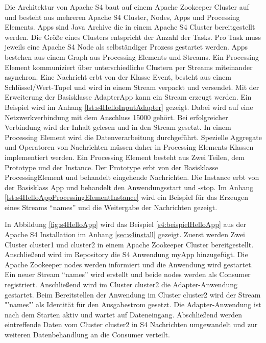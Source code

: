 Die Architektur von Apache S4 baut auf einem Apache Zookeeper Cluster auf und besteht aus mehreren Apache S4 Cluster, Nodes, Apps und Processing Elements. Apps sind Java Archive die in einem Apache S4 Cluster bereitgestellt werden. Die Größe eines Clusters entspricht der Anzahl der Tasks. Pro Task muss jeweils eine Apache S4 Node als selbständiger Prozess gestartet werden. Apps bestehen aus einem Graph aus Processing Elements und Streams. Ein Processing Element kommuniziert über unterschiedliche Clustern per Streams miteinander asynchron. Eine Nachricht erbt von der Klasse Event, besteht aus einem Schlüssel/Wert-Tupel und wird in einem Stream verpackt und versendet. Mit der Erweiterung der Basisklasse AdapterApp kann ein Stream erzeugt werden. Ein Beispiel wird im Anhang \ref{lst:s4HelloInputAdapter} gezeigt. Dabei wird auf eine Netzwerkverbindung mit dem Anschluss 15000 gehört. Bei erfolgreicher Verbindung wird der Inhalt gelesen und in den Stream gesetzt. In einem Processing Element wird die Datenverarbeitung durchgeführt. Spezielle Aggregate und Operatoren von Nachrichten müssen daher in Processing Elements-Klassen implementiert werden. Ein Processing Element besteht aus Zwei Teilen, dem Prototype und der Instance. Der Prototype erbt von der Basisklasse ProcessingElement und behandelt eingehende Nachrichten. Die Instance erbt von der Basisklass App und behandelt den Anwendungsstart und -stop. Im Anhang \ref{lst:s4HelloAppProcessingElementInstance} wird ein Beispiel für das Erzeugen eines Streams "`names"' und die Weitergabe der Nachrichten gezeigt. 

In Abbildung \ref{fig:s4HelloApp} wird das Beispiel \ref{s4:beispielHelloApp} aus der Apache S4 Installation im Anhang \ref{sec:s4install} gezeigt. Zuerst werden Zwei Cluster cluster1 und cluster2 in einem Apache Zookeeper Cluster bereitgestellt. Anschließend wird im Repository die S4 Anwendung myApp hinzugefügt. Die Apache Zookeeper nodes werden informiert und die Anwendung wird gestartet. Ein neuer Stream "`names"' wird erstellt und beide nodes werden als Consumer registriert. Anschließend wird im Cluster cluster2 die Adapter-Anwendung gestartet. Beim Bereitstellen der Anwendung im Cluster cluster2 wird der Stream "'names"' als Identität für den Ausgabestrom gesetzt. Die Adapter-Anwendung ist nach dem Starten aktiv und wartet auf Dateneingang. Abschließend werden eintreffende Daten vom Cluster cluster2 in S4 Nachrichten umgewandelt und zur weiteren Datenbehandlung an die Consumer verteilt.

